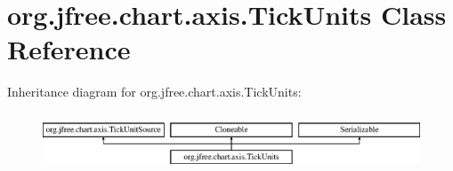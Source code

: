 \hypertarget{classorg_1_1jfree_1_1chart_1_1axis_1_1_tick_units}{}\section{org.\+jfree.\+chart.\+axis.\+Tick\+Units Class Reference}
\label{classorg_1_1jfree_1_1chart_1_1axis_1_1_tick_units}
Inheritance diagram for org.\+jfree.\+chart.\+axis.\+Tick\+Units\+:\begin{figure}[H]
\begin{center}
\leavevmode
\includegraphics[height=1.720430cm]{classorg_1_1jfree_1_1chart_1_1axis_1_1_tick_units}
\end{center}
\end{figure}
